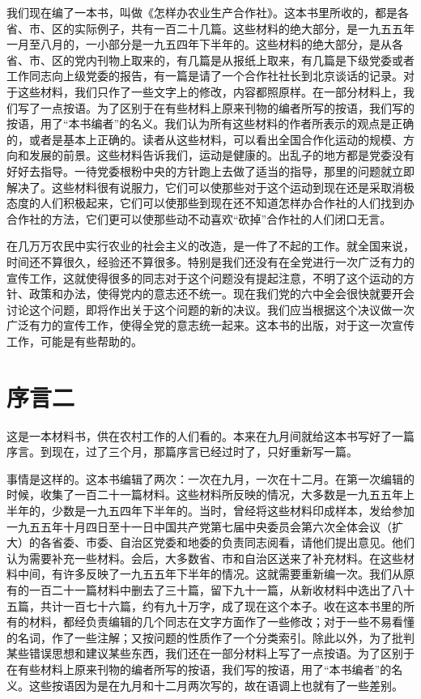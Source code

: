 我们现在编了一本书，叫做《怎样办农业生产合作社》。这本书里所收的，都是各省、市、区的实际例子，共有一百二十几篇。这些材料的绝大部分，是一九五五年一月至八月的，一小部分是一九五四年下半年的。这些材料的绝大部分，是从各省、市、区的党内刊物上取来的，有几篇是从报纸上取来，有几篇是下级党委或者工作同志向上级党委的报告，有一篇是请了一个合作社社长到北京谈话的记录。对于这些材料，我们只作了一些文字上的修改，内容都照原样。在一部分材料上，我们写了一点按语。为了区别于在有些材料上原来刊物的编者所写的按语，我们写的按语，用了“本书编者”的名义。我们认为所有这些材料的作者所表示的观点是正确的，或者是基本上正确的。读者从这些材料，可以看出全国合作化运动的规模、方向和发展的前景。这些材料告诉我们，运动是健康的。出乱子的地方都是党委没有好好去指导。一待党委根粉中央的方针跑上去做了适当的指导，那里的问题就立即解决了。这些材料很有说服力，它们可以使那些对于这个运动到现在还是采取消极态度的人们积极起来，它们可以使那些到现在还不知道怎样办合作社的人们找到办合作社的方法，它们更可以使那些动不动喜欢“砍掉”合作社的人们闭口无言。

在几万万农民中实行农业的社会主义的改造，是一件了不起的工作。就全国来说，时间还不算很久，经验还不算很多。特别是我们还没有在全党进行一次广泛有力的宣传工作，这就使得很多的同志对于这个问题没有提起注意，不明了这个运动的方针、政策和办法，使得党内的意志还不统一。现在我们党的六中全会很快就要开会讨论这个问题，即将作出关于这个问题的新的决议。我们应当根据这个决议做一次广泛有力的宣传工作，使得全党的意志统一起来。这本书的出版，对于这一次宣传工作，可能是有些帮助的。

\date{一九五五年十二月二十七日}
\section{序言二}

这是一本材料书，供在农村工作的人们看的。本来在九月间就给这本书写好了一篇序言。到现在，过了三个月，那篇序言已经过时了，只好重新写一篇。

事情是这样的。这本书编辑了两次：一次在九月，一次在十二月。在第一次编辑的时候，收集了一百二十一篇材料。这些材料所反映的情况，大多数是一九五五年上半年的，少数是一九五四年下半年的。当时，曾经将这些材料印成样本，发给参加一九五五年十月四日至十一日中国共产党第七届中央委员会第六次全体会议（扩大）的各省委、市委、自治区党委和地委的负责同志阅看，请他们提出意见。他们认为需要补充一些材料。会后，大多数省、市和自治区送来了补充材料。在这些材料中间，有许多反映了一九五五年下半年的情况。这就需要重新编一次。我们从原有的一百二十一篇材料中删去了三十篇，留下九十一篇，从新收材料中选出了八十五篇，共计一百七十六篇，约有九十万字，成了现在这个本子。收在这本书里的所有的材料，都经负责编辑的几个同志在文字方面作了一些修改；对于一些不易看懂的名词，作了一些注解；又按问题的性质作了一个分类索引。除此以外，为了批判某些错误思想和建议某些东西，我们还在一部分材料上写了一点按语。为了区别于在有些材料上原来刊物的编者所写的按语，我们写的按语，用了“本书编者”的名义。这些按语因为是在九月和十二月两次写的，故在语调上也就有了一些差别。

